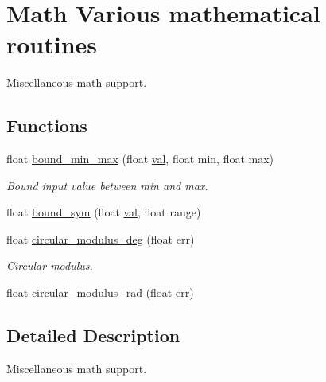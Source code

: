 \hypertarget{group___miscellaneous_math}{\section{Math Various mathematical routines}
\label{group___miscellaneous_math}
}


Miscellaneous math support.  


\subsection*{Functions}
\begin{DoxyCompactItemize}
\item 
float \hyperlink{group___miscellaneous_math_gae7fa5c4383337339fe17371cd78d7264}{bound\-\_\-min\-\_\-max} (float \hyperlink{group___p_i_o_s___t_i_m_ga757344f09097232d715d55cbf9d61a43}{val}, float min, float max)
\begin{DoxyCompactList}\small\item\em Bound input value between min and max. \end{DoxyCompactList}\item 
float \hyperlink{group___miscellaneous_math_gab53f96ff60025bfea084300f2cec575e}{bound\-\_\-sym} (float \hyperlink{group___p_i_o_s___t_i_m_ga757344f09097232d715d55cbf9d61a43}{val}, float range)
\item 
float \hyperlink{group___miscellaneous_math_gab7dbfea1a0ae1bd6758c2cb07b278ebf}{circular\-\_\-modulus\-\_\-deg} (float err)
\begin{DoxyCompactList}\small\item\em Circular modulus. \end{DoxyCompactList}\item 
float \hyperlink{group___miscellaneous_math_gaba90e72f0f9a03ff25411ec53f5d492b}{circular\-\_\-modulus\-\_\-rad} (float err)
\end{DoxyCompactItemize}


\subsection{Detailed Description}
Miscellaneous math support. 

